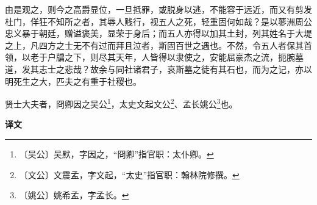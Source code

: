 \documentclass[12pt,UTF-8,openany,a4]{ctexbook}
\begin{document}
\begin{large}
    由是观之，则今之高爵显位，一旦抵罪，或脱身以逃，不能容于远近，而又有剪发杜门，佯狂不知所之者，其辱人贱行，视五人之死，轻重固何如哉？是以蓼洲周公忠义暴于朝廷，赠谥褒美，显荣于身后；而五人亦得以加其土封，列其姓名于大堤之上，凡四方之士无不有过而拜且泣者，斯固百世之遇也。不然，令五人者保其首领，以老于户牖之下，则尽其天年，人皆得以隶使之，安能屈豪杰之流，扼腕墓道，发其志士之悲哉？故余与同社诸君子，哀斯墓之徒有其石也，而为之记，亦以明死生之大，匹夫之有重于社稷也。
    
    贤士大夫者，冏卿因之吴公\footnote{〔吴公〕\yiwen 吴默，字因之，“冏卿”指官职：太仆卿。}，太史文起文公\footnote{〔文公〕\yiwen 文震孟，字文起，“太史”指官职：翰林院修撰。}、孟长姚公\footnote{〔姚公〕\yiwen 姚希孟，字孟长。}也。
\end{large}


\newpage

\begin{Large}
    \noindent\textbf{译文}
\end{Large}


\vspace{1em}
\end{document}
